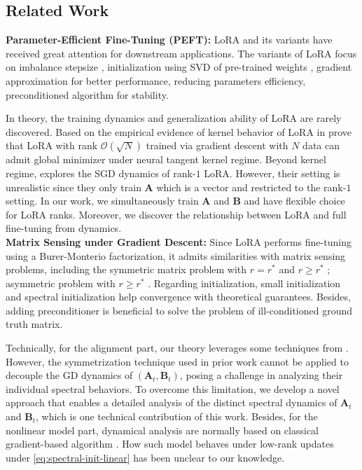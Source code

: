 \subsection{Related Work}

\noindent
{\bf Parameter-Efficient Fine-Tuning (PEFT):}
LoRA \citep{hu2022lora} and its variants have received great attention for downstream applications.
The variants of LoRA focus on imbalance stepsize \citep{hayou2024lora+}, initialization using SVD of pre-trained weights \citep{meng2024pissa}, gradient approximation \citep{wang2024lora,wang2024lorapro} for better performance, reducing parameters \citep{kopiczko2024vera} efficiency, preconditioned algorithm \citep{zhang2024riemannian} for stability. 


In theory, the training dynamics and generalization ability of LoRA are rarely discovered. Based on the empirical evidence of kernel behavior of LoRA in \cite{malladi2023kernel,jang2024lora} prove that LoRA with rank $\mathcal{O}(\sqrt{N})$ trained via gradient descent with $N$ data can admit global minimizer under neural tangent kernel \citep{jacot2018neural} regime. Beyond kernel regime, \cite{dayi2024gradientdynamicslowrankfinetuning} explores the SGD dynamics of rank-$1$ LoRA. However, their setting is unrealistic since they only train $\bm A$ which is a vector and restricted to the rank-$1$ setting. In our work, we simultaneously train $\bm A$ and $\bm B$ and have flexible choice for LoRA ranks. Moreover, we discover the relationship between LoRA and full fine-tuning from dynamics.\\

\noindent
{\bf Matrix Sensing under Gradient Descent:}
Since LoRA performs fine-tuning using a Burer-Monterio factorization, it admits similarities with matrix sensing problems, including the symmetric matrix problem  with $r=r^*$ \citep{li2018algorithmic} and $r \geq r^*$ \citep{stoger2021small}; asymmetric problem with $r\geq r^*$ \citep{soltanolkotabi2023implicit,xiong2023over}.
Regarding initialization, small initialization \citep{ding2022validation} and spectral initialization \citep{ma2021beyond} help convergence with theoretical guarantees.
Besides, adding preconditioner \citep{zhang2021preconditioned,tong2021accelerating,xu2023power,zhang2023preconditioned} is beneficial to solve the problem of ill-conditioned ground truth matrix.

Technically, for the alignment part, our theory leverages some techniques from \cite{soltanolkotabi2023implicit}. However, the symmetrization technique used in prior work cannot be applied to decouple the GD dynamics of $(\bm A_t, \bm B_t)$, posing a challenge in analyzing their individual spectral behaviors. To overcome this limitation, we develop a novel approach that enables a detailed analysis of the distinct spectral dynamics of $\bm A_t$ and $\bm B_t$, which is one technical contribution of this work.
Besides, for the nonlinear model part, dynamical analysis are normally based on classical gradient-based algorithm \citep{damian2022neural,lee2024neural}.
How such model behaves under low-rank updates under \eqref{eq:spectral-init-linear} has been unclear to our knowledge.